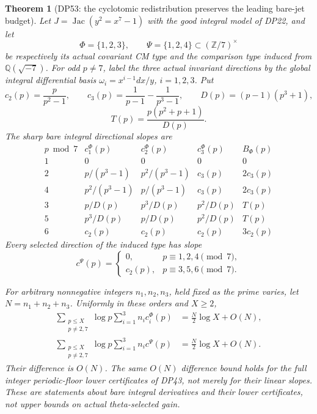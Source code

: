 \documentclass[11pt,a4paper]{article}
\newtheorem{theorem}{Theorem}[section]
\theoremstyle{definition}\newtheorem{remark}[theorem]{Remark}
\newcommand{\Z}{\mathbb Z}\newcommand{\Q}{\mathbb Q}\newcommand{\F}{\mathbb F}
\begin{document}
\begin{theorem}[DP53: the cyclotomic redistribution preserves the leading bare-jet budget]\label{DP53}
Let $J=\operatorname{Jac}(y^2=x^7-1)$ with the good integral model of DP22, and let
\[
 \Phi=\{1,2,3\},\qquad\Psi=\{1,2,4\}
       \subset(\Z/7)^\times
\]
be respectively its actual covariant CM type and the comparison type induced from $\Q(\sqrt{-7})$.
For odd $p\ne7$, label the three actual invariant directions by the global integral differential basis
$\omega_i=x^{i-1}dx/y$, $i=1,2,3$.
Put
\[
 c_2(p)=\frac{p}{p^2-1},\qquad
 c_3(p)=\frac1{p-1}-\frac1{p^3-1},\qquad
 D(p)=(p-1)(p^3+1),
\]
\[
 T(p)=\frac{p(p^2+p+1)}{D(p)}.
\]
The sharp \emph{bare integral directional} slopes are
\[
\begin{array}{c|ccc|c}
p\bmod7&c_1^\Phi(p)&c_2^\Phi(p)&c_3^\Phi(p)&B_\Phi(p)\\\hline
1&0&0&0&0\\
2&p/(p^3-1)&p^2/(p^3-1)&c_3(p)&2c_3(p)\\
4&p^2/(p^3-1)&p/(p^3-1)&c_3(p)&2c_3(p)\\
3&p/D(p)&p^3/D(p)&p^2/D(p)&T(p)\\
5&p^3/D(p)&p/D(p)&p^2/D(p)&T(p)\\
6&c_2(p)&c_2(p)&c_2(p)&3c_2(p)
\end{array}
\]
Every selected direction of the induced type has slope
\[
 c^\Psi(p)=
 \begin{cases}0,&p\equiv1,2,4\pmod7,\\
 c_2(p),&p\equiv3,5,6\pmod7.\end{cases}
\]

For arbitrary nonnegative integers $n_1,n_2,n_3$, held fixed as the prime varies, let $N=n_1+n_2+n_3$. Uniformly in these orders and $X\ge2$,
\begin{align}
 \sum_{\substack{p\le X\\p\ne2,7}}\log p
       \sum_{i=1}^3 n_i c_i^\Phi(p)
       &=\frac N2\log X+O(N),\label{eq:cmprimeactual}\\
 \sum_{\substack{p\le X\\p\ne2,7}}\log p
       \sum_{i=1}^3 n_i c^\Psi(p)
       &=\frac N2\log X+O(N).\label{eq:cmprimeinduced}
\end{align}
Their difference is $O(N)$. The same $O(N)$ difference bound holds for the full integer periodic-floor lower certificates of DP43, not merely for their linear slopes.
These are statements about bare integral derivatives and their lower certificates, not upper bounds on actual theta-selected gain.
\end{theorem}
\end{document}
